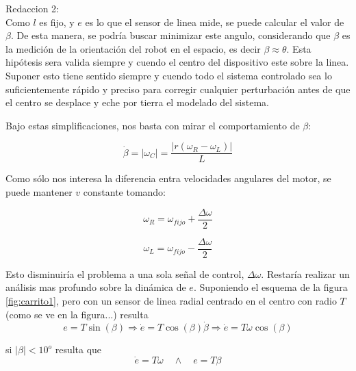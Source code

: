 \documentclass[10pt,conference,a4paper,onecolumn]{article}%
\begin{document}
Redaccion 2:\\
Como $l$ es fijo, y $e$ es lo que el sensor de linea mide, se puede calcular el valor de $\beta$. De esta manera, se podría buscar minimizar este angulo, considerando que $\beta$ es la medición de la orientación del robot en el espacio, es decir $\beta \approx \theta$. Esta hipótesis sera valida siempre y cuendo el centro del dispositivo este sobre la linea. Suponer esto tiene sentido siempre y cuendo todo el sistema controlado sea lo suficientemente rápido y preciso para corregir cualquier perturbación antes de que el centro se desplace y eche por tierra el modelado del sistema.

Bajo estas simplificaciones, nos basta con mirar el comportamiento de $\beta$:

\begin{equation}
\dot{\beta}=\vert \omega_C \vert	=\frac{ \vert r(\omega _R - \omega _L) \vert }{L}
\end{equation}

Como sólo nos interesa la diferencia entra velocidades angulares del motor, se puede mantener $v$ constante tomando:

\begin{equation}
\omega _R = \omega _{fijo} + \frac{\Delta \omega}{2} 
\end{equation}

\begin{equation}
\omega _L = \omega _{fijo} -\frac{\Delta \omega}{2}
\end{equation}

Esto disminuiría el problema a una sola señal de control, $\Delta \omega$. Restaría realizar un análisis mas profundo sobre la dinámica de $e$.
Suponiendo el esquema de la figura \ref{fig:carrito1}, pero con un sensor de linea radial centrado en el centro con radio $T$ (como se ve en la figura...) resulta
\begin{equation}
e=T \sin (\beta)  \Longrightarrow \dot{e}=T \cos (\beta) \dot{\beta}  \Longrightarrow \dot{e} = T \omega \cos(\beta)
\end{equation}

si $\vert\beta\vert<10^o$ resulta que  
\begin{equation}
\dot{e} = T \omega \quad \wedge \quad  e=T \beta
\end{equation}
\end{document}
